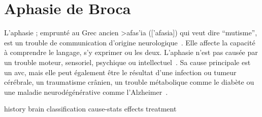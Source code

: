 \section{Aphasie de Broca}

L'aphasie ; emprunté au Grec ancien \textgreek{>afas'ia} (['afasia]) qui veut dire ``mutisme'',
est un trouble de communication d'origine neurologique~\cite{Larousse}. 
Elle affecte la capacité à comprendre le langage, s'y exprimer ou les deux.
L'aphasie n'est pas causée par un trouble moteur, sensoriel, psychique ou intellectuel~\cite{Chapey_2008}.
Sa cause principale est un \gls{avc}, 
mais elle peut également être le résultat d'une infection ou tumeur cérébrale, 
un traumatisme crânien, un trouble métabolique comme le diabète 
ou une maladie neurodégénérative comme l'Alzheimer~\cite{Hallowell_2017}.

{history}
{brain}
{classification}
{cause-stats}
{effects}
{treatment}